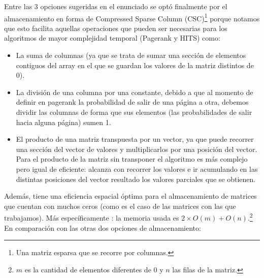 \documentclass[a4paper]{article}
\begin{document}
Entre las 3 opciones sugeridas en el enunciado se opt\'{o} finalmente por el almacenamiento en forma de Compressed Sparse Column (CSC)\footnote{Una matriz esparsa que se recorre por columnas.} porque notamos que esto facilita aquellas operaciones que pueden ser necesarias para los algoritmos de mayor complejidad temporal (Pagerank y HITS) como:

\begin{itemize}

\item La suma de columnas (ya que se trata de sumar una secci\'{o}n de elementos contiguos del array en el que se guardan los valores de la matriz distintos de 0).

\item La divisi\'{o}n de una columna por una constante, debido a que al momento de definir en pagerank la probabilidad de salir de una p\'{a}gina a otra, debemos dividir las columnas de forma que sus elementos (las probabilidades de salir hacia alguna p\'{a}gina) sumen 1.

\item El producto de una matriz transpuesta por un vector, ya que puede recorrer una sección del vector de valores y multiplicarlos por una posición del vector. Para el producto de la matriz sin transponer el algoritmo es más complejo pero igual de eficiente: alcanza con recorrer los valores e ir acumulando en las distintas posiciones del vector resultado los valores parciales que se obtienen.

\end{itemize}

Además, tiene una eficiencia espacial \'{o}ptima para el almacenamiento de matrices que cuentan con muchos ceros (como es el caso de las matrices con las que trabajamos). M\'{a}s espec\'{i}ficamente : la memoria usada es $2 \times  O(m)+O(n)$.\footnote{$m$ es la cantidad de elementos diferentes de 0 y $n$ las filas de la matriz.} \\ 

En comparaci\'{o}n con las otras dos opciones de almacenamiento:
\end{document}
